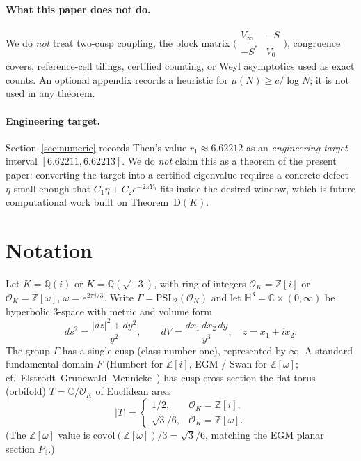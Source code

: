 \documentclass[11pt]{amsart}
\theoremstyle{definition}
\newcommand{\HH}{\mathbb{H}^3}
\newcommand{\CC}{\mathbb{C}}
\newcommand{\ZZ}{\mathbb{Z}}
\newcommand{\QQ}{\mathbb{Q}}
\newcommand{\PSL}{\mathrm{PSL}}
\newcommand{\OK}{\mathcal{O}_K}
\newcommand{\abs}[1]{\lvert#1\rvert}
\begin{document}
\paragraph{What this paper does not do.}
We do \emph{not} treat two-cusp coupling, the block matrix
$\bigl(\begin{smallmatrix}V_\infty&-S\\-S^*&V_0\end{smallmatrix}\bigr)$,
congruence covers, reference-cell tilings, certified counting, or Weyl
asymptotics used as exact counts.  An optional appendix records a
heuristic for $\mu(N)\ge c/\log N$; it is not used in any theorem.

\paragraph{Engineering target.}
Section~\ref{sec:numeric} records Then's value $r_1\approx 6.62212$ as an
\emph{engineering target} interval $[6.62211,6.62213]$.  We do
\emph{not} claim this as a theorem of the present paper: converting the
target into a certified eigenvalue requires a concrete defect $\eta$
small enough that $C_1\eta+C_2 e^{-2\pi Y_0}$ fits inside the desired
window, which is future computational work built on Theorem~D$(K)$.

\section{Notation}
\label{sec:notation}

Let $K=\QQ(i)$ or $K=\QQ(\sqrt{-3})$, with ring of integers
$\OK=\ZZ[i]$ or $\OK=\ZZ[\omega]$, $\omega=e^{2\pi i/3}$.  Write
$\Gamma=\PSL_2(\OK)$ and let $\HH=\CC\times(0,\infty)$ be hyperbolic
$3$-space with metric and volume form
\begin{equation}
\label{eq:hypmetric}
  ds^2 = \frac{\abs{dz}^2+dy^2}{y^2},\qquad
  dV = \frac{dx_1\,dx_2\,dy}{y^3},\quad z=x_1+ix_2.
\end{equation}
The group $\Gamma$ has a single cusp (class number one), represented by
$\infty$.  A standard fundamental domain $F$ (Humbert for $\ZZ[i]$,
EGM / Swan for $\ZZ[\omega]$; cf.\ Elstrodt--Grunewald--Mennicke~\cite{EGM})
has cusp cross-section the flat torus (orbifold)
$T=\CC/\OK$ of Euclidean area
\begin{equation}
\label{eq:areaT}
  \abs{T}
  =
  \begin{cases}
    1/2, & \OK=\ZZ[i],\\
    \sqrt{3}/6, & \OK=\ZZ[\omega].
  \end{cases}
\end{equation}
(The $\ZZ[\omega]$ value is $\mathrm{covol}(\ZZ[\omega])/3=\sqrt{3}/6$,
matching the EGM planar section $P_3$.)
\end{document}
